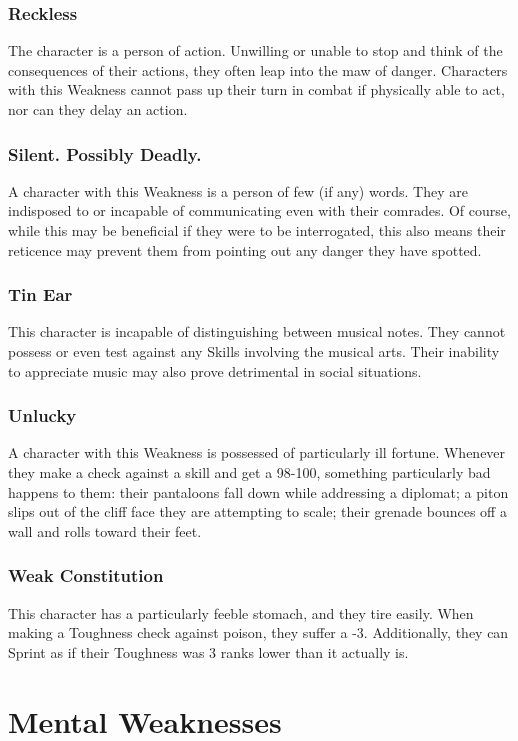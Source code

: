\documentclass[oneside]{book}
\begin{document}
\begin{multicols}{2}
\subsubsection{Reckless}
The character is a person of action. Unwilling or unable to stop and think of the consequences of their actions, they often leap into the maw of danger. Characters with this Weakness cannot pass up their turn in combat if physically able to act, nor can they delay an action. 

\subsubsection{Silent. Possibly Deadly.}
A character with this Weakness is a person of few (if any) words. They are indisposed to or incapable of communicating even with their comrades. Of course, while this may be beneficial if they were to be interrogated, this also means their reticence may prevent them from pointing out any danger they have spotted. 

\subsubsection{Tin Ear}
This character is incapable of distinguishing between musical notes. They cannot possess or even test against any Skills involving the musical arts. Their inability to appreciate music may also prove detrimental in social situations. 

\subsubsection{Unlucky}
A character with this Weakness is possessed of particularly ill fortune. Whenever they make a check against a skill and get a 98-100, something particularly bad happens to them: their pantaloons fall down while addressing a diplomat; a piton slips out of the cliff face they are attempting to scale; their grenade bounces off a wall and rolls toward their feet. 

\subsubsection{Weak Constitution}
This character has a particularly feeble stomach, and they tire easily. When making a Toughness check against poison, they suffer a -3. Additionally, they can Sprint as if their Toughness was 3 ranks lower than it actually is.

\section{Mental Weaknesses}

\end{multicols}
\end{document}
